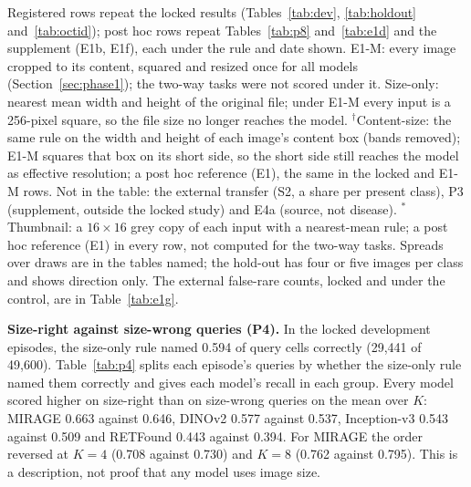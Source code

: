 \documentclass[conference]{IEEEtran}
\begin{document}
\begin{table}[t]
\caption{Every $K$-shot disease task with benchmark supports on which all four encoders were scored, side by side: macro recall on the mean over $K=1$, 2, 4, 8 (mean of 100 support draws), with the locked inputs and under the main control E1-M, and how each row was fixed. No new number; no row replaces a locked result.}
\label{tab:tasks}
\centering\footnotesize
\resizebox{\textwidth}{!}{}
\par\smallskip
\parbox{\textwidth}{\footnotesize Registered rows repeat the locked results (Tables~\ref{tab:dev}, \ref{tab:holdout} and~\ref{tab:octid}); post hoc rows repeat Tables~\ref{tab:p8} and~\ref{tab:e1d} and the supplement (E1b, E1f), each under the rule and date shown. E1-M: every image cropped to its content, squared and resized once for all models (Section~\ref{sec:phase1}); the two-way tasks were not scored under it. Size-only: nearest mean width and height of the original file; under E1-M every input is a 256-pixel square, so the file size no longer reaches the model. $^{\dagger}$Content-size: the same rule on the width and height of each image's content box (bands removed); E1-M squares that box on its short side, so the short side still reaches the model as effective resolution; a post hoc reference (E1), the same in the locked and E1-M rows. Not in the table: the external transfer (S2, a share per present class), P3 (supplement, outside the locked study) and E4a (source, not disease). $^{*}$Thumbnail: a $16\times16$ grey copy of each input with a nearest-mean rule; a post hoc reference (E1) in every row, not computed for the two-way tasks. Spreads over draws are in the tables named; the hold-out has four or five images per class and shows direction only. The external false-rare counts, locked and under the control, are in Table~\ref{tab:e1g}.}
\end{table}

\textbf{Size-right against size-wrong queries (P4).} In the locked development episodes, the size-only rule named 0.594 of query cells correctly (29,441 of 49,600). Table~\ref{tab:p4} splits each episode's queries by whether the size-only rule named them correctly and gives each model's recall in each group. Every model scored higher on size-right than on size-wrong queries on the mean over $K$: MIRAGE 0.663 against 0.646, DINOv2 0.577 against 0.537, Inception-v3 0.543 against 0.509 and RETFound 0.443 against 0.394. For MIRAGE the order reversed at $K=4$ (0.708 against 0.730) and $K=8$ (0.762 against 0.795). This is a description, not proof that any model uses image size.
\end{document}
